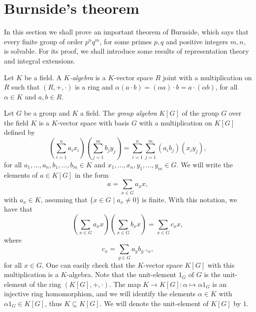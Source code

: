 %

\section{Burnside's theorem}

In this section we shall prove an important theorem of Burnside, which says that every finite group of order $p^nq^m$, for some primes $p,q$ and positive integers $m,n$, is solvable. For its proof, we shall introduce some results of representation theory and integral extensions. 

Let $K$ be a field. A {\em $K$-algebra} is a $K$-vector space $R$ joint with a multiplication on $R$ such that
$(R,+,\cdot)$ is a ring and $\alpha(a\cdot b)=(\alpha a)\cdot b=a\cdot (\alpha b)$, for all $\alpha\in K$ and $a,b\in R$.

Let $G$ be a group and $K$ a field. The {\em group algebra} $K[G]$ of the group $G$ over the field $K$ is a $K$-vector space with basis $G$
with a multiplication on $K[G]$ defined by
\[ \left(\sum_{i=1}^na_ix_i\right)\left(\sum_{j=1}^mb_jy_j\right)=\sum_{i=1}^n\sum_{j=1}^m(a_ib_j)(x_iy_j),\]
for all $a_1,\dots, a_n,b_1,\dots ,b_m\in K$ and $x_1,\dots ,x_n,y_1,\dots ,y_m\in G$.
We will write the elements of $a\in K[G]$ in the form
\[ a=\sum_{x\in G}a_xx,\]
with $a_x\in K$, assuming that $\{ x\in G\mid a_x\neq 0\}$ is finite. With this notation, we have that
\[\left(\sum_{x\in G}a_xx\right)\left(\sum_{x\in G}b_xx\right)=\sum_{x\in G}c_xx,\]
where
\[ c_x=\sum_{y\in G}a_yb_{y^{-1}x},\]
for all $x\in G$. One can easily check that the $K$-vector space $K[G]$ with this multiplication is a $K$-algebra. Note that the unit-element $1_G$ of $G$ is the unit-element of the ring $(K[G],+,\cdot)$. The map $K\to K[G]:\alpha\mapsto \alpha 1_G$ is an injective ring homomorphism, and we will identify the elements $\alpha\in K$ with $\alpha 1_G\in K[G]$, thus $K\subseteq K[G]$. We will denote the unit-element of $K[G]$ by $1$.

